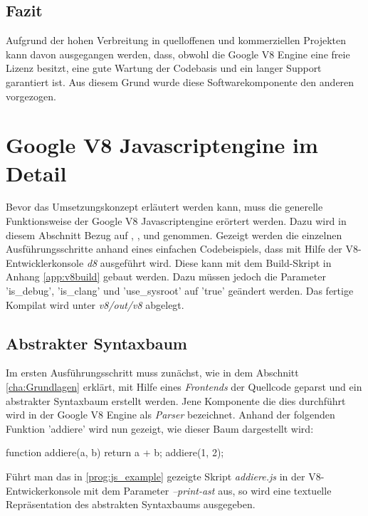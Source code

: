 \subsection{Fazit}

Aufgrund der hohen Verbreitung in quelloffenen und kommerziellen Projekten kann davon ausgegangen werden, dass, obwohl die Google V8 Engine 
eine freie Lizenz besitzt, eine gute Wartung der Codebasis und ein langer Support garantiert ist. Aus diesem Grund wurde diese Softwarekomponente 
den anderen vorgezogen.

\section{Google V8 Javascriptengine im Detail}

Bevor das Umsetzungskonzept erläutert werden kann, muss die generelle Funktionsweise der Google V8 Javascriptengine
erörtert werden. Dazu wird in diesem Abschnitt Bezug auf \cite{v8ByteCode1}, \cite{v8ByteCode2}, und \cite{v8Pipeline} genommen. 
Gezeigt werden die einzelnen Ausführungsschritte anhand eines einfachen Codebeispiels,
dass mit Hilfe der V8-Entwicklerkonsole \textit{d8} ausgeführt wird. Diese kann mit dem Build-Skript in Anhang \ref{app:v8build}
gebaut werden. Dazu müssen jedoch die Parameter 'is\_debug', 'is\_clang' und 'use\_sysroot' auf 'true' geändert werden. 
Das fertige Kompilat wird unter \textit{v8/out/v8} abgelegt.

\subsection{Abstrakter Syntaxbaum}

Im ersten Ausführungsschritt muss zunächst, wie in dem Abschnitt \ref{cha:Grundlagen} erklärt, mit Hilfe eines \textit{Frontends} der Quellcode geparst und
ein abstrakter Syntaxbaum erstellt werden. Jene Komponente die dies durchführt wird in der Google V8 Engine als \textit{Parser} bezeichnet.
Anhand der folgenden Funktion 'addiere' wird nun gezeigt, wie dieser Baum dargestellt wird:

\begin{program}[h]
\caption{Beispielcode, addiere.js}
\label{prog:js_example}
\begin{GenericCode}
function addiere(a, b) {
	return a + b;
}
addiere(1, 2);
\end{GenericCode}
\end{program}

Führt man das in \ref{prog:js_example} gezeigte Skript \textit{addiere.js} in der V8-Entwickerkonsole mit dem Parameter \textit{--print-ast} aus, so wird eine
textuelle Repräsentation des abstrakten Syntaxbaums ausgegeben.

